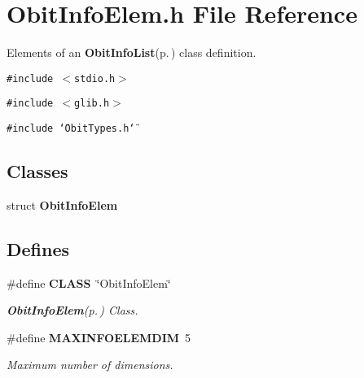 \section{Obit\-Info\-Elem.h File Reference}
\label{ObitInfoElem_8h}
Elements of an {\bf Obit\-Info\-List}{\rm (p.\,\pageref{structObitInfoList})} class definition. 

{\tt \#include $<$stdio.h$>$}\par
{\tt \#include $<$glib.h$>$}\par
{\tt \#include \char`\"{}Obit\-Types.h\char`\"{}}\par
\subsection*{Classes}
\begin{CompactItemize}
\item 
struct {\bf Obit\-Info\-Elem}
\end{CompactItemize}
\subsection*{Defines}
\begin{CompactItemize}
\item 
\#define {\bf CLASS}\ \char`\"{}Obit\-Info\-Elem\char`\"{}
\begin{CompactList}\small\item\em {\bf Obit\-Info\-Elem}{\rm (p.\,\pageref{structObitInfoElem})} Class. \item\end{CompactList}\item 
\#define {\bf MAXINFOELEMDIM}\ 5
\begin{CompactList}\small\item\em Maximum number of dimensions. \item\end{CompactList}\end{CompactItemize}
